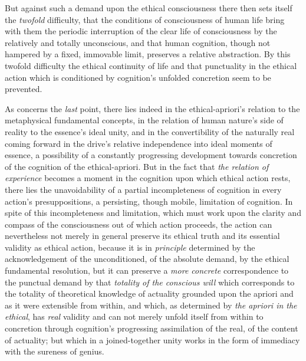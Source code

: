 \documentclass[12pt,a4paper]{book}
\begin{document}
But against such a demand upon the ethical consciousness there then sets itself
the \emph{twofold} difficulty, that the conditions of consciousness of human
life bring with them the periodic interruption of the clear life of
consciousness by the relatively and totally unconscious, and that human
cognition, though not hampered by a fixed, immovable limit, preserves a relative
abstraction. By this twofold difficulty the ethical continuity of life and that
punctuality in the ethical action which is conditioned by cognition's unfolded
concretion seem to be prevented.

As concerns the \emph{last} point, there lies indeed in the ethical-apriori's
relation to the metaphysical fundamental concepts, in the relation of human
nature's side of reality to the essence's ideal unity, and in the convertibility
of the naturally real coming forward in the drive's relative independence into
ideal moments of essence, a possibility of a constantly progressing development
towards concretion of the cognition of the ethical-apriori. But in the fact that
\emph{the relation of experience} becomes a moment in the cognition upon which
ethical action rests, there lies the unavoidability of a partial incompleteness
of cognition in every action's presuppositions, a persisting, though mobile,
limitation of cognition. In spite of this incompleteness and limitation, which
must work upon the clarity and compass of the consciousness out of which action
proceeds, the action can nevertheless not merely in general preserve its ethical
truth and its essential validity as ethical action, because it is in
\emph{principle} determined by the acknowledgement of the unconditioned, of the
absolute demand, by the ethical fundamental resolution, but it can preserve a
\emph{more concrete} correspondence to the punctual demand by that \emph{totality
of the conscious will} which corresponds to the totality of theoretical knowledge
of actuality grounded upon the apriori and as it were extensible from within, and
which, as determined by \emph{the apriori in the ethical}, has \emph{real}
validity and can not merely unfold itself from within to concretion through
cognition's progressing assimilation of the real, of the content of actuality;
but which in a joined-together unity works in the form of immediacy with the
sureness of genius.
\end{document}
